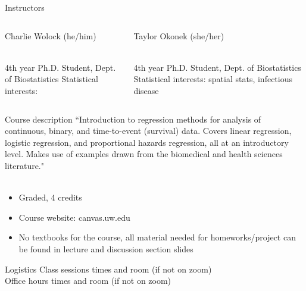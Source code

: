 \documentclass{beamer}
\begin{document}
\begin{frame}{Instructors}
\begin{columns}
	\begin{column}[t]{0.4\textwidth}
            \small Charlie Wolock (he/him) \\~\
            
            \small 4th year Ph.D. Student, Dept. of Biostatistics
            \small Statistical interests:
	\end{column}
	\begin{column}[t]{0.4\textwidth}  %
			\small Taylor Okonek (she/her) \\~\ 
			
			\small 4th year Ph.D. Student, Dept. of Biostatistics
			\small Statistical interests: spatial stats, infectious disease
	\end{column}
\end{columns}

\end{frame}

\begin{frame}{Course description}
``Introduction to regression methods for analysis of continuous, binary, and time-to-event (survival) data. Covers linear regression, logistic regression, and proportional hazards regression, all at an introductory level. Makes use of examples drawn from the biomedical and health sciences literature." \\~\

\begin{itemize}
	\item Graded, 4 credits
	\item Course website: canvas.uw.edu
	\item No textbooks for the course, all material needed for homeworks/project can be found in lecture and discussion section slides
\end{itemize}

\end{frame}

\begin{frame}{Logistics}
Class sessions times and room (if not on zoom) \\
Office hours times and room (if not on zoom)
\end{frame}
\end{document}
